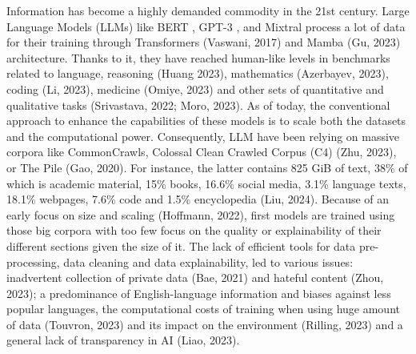 \documentclass{article}
\begin{document}
Information has become a highly demanded commodity in the 21st century. Large Language Models (LLMs) like BERT \citep{devlin_bert_2019}, GPT-3 \citep{brown_language_2020}, and Mixtral \citep{jiang_mixtral_2024} process a lot of data for their training through Transformers (Vaswani, 2017) and Mamba (Gu, 2023) architecture. Thanks to it, they have reached human-like levels in benchmarks related to language, reasoning (Huang 2023), mathematics (Azerbayev, 2023), coding (Li, 2023), medicine (Omiye, 2023) and other sets of quantitative and qualitative tasks (Srivastava, 2022; Moro, 2023). As of today, the conventional approach to enhance the capabilities of these models is to scale both the datasets and the computational power. Consequently, LLM have been relying on massive corpora like CommonCrawls, Colossal Clean Crawled Corpus (C4) (Zhu, 2023), or The Pile (Gao, 2020). For instance, the latter contains 825 GiB of text, 38\% of which is academic material, 15\% books, 16.6\% social media, 3.1\% language texts, 18.1\% webpages, 7.6\% code and 1.5\% encyclopedia (Liu, 2024). Because of an early focus on size and scaling (Hoffmann, 2022), first models are trained using those big corpora with too few focus on the quality or explainability of their different sections given the size of it.  The lack of efficient tools for data pre-processing, data cleaning and data explainability,  led to various issues: inadvertent collection of private data (Bae, 2021) and hateful content (Zhou, 2023); a predominance of English-language information and biases against less popular languages, the computational costs of training when using huge amount of data (Touvron, 2023) and its impact on the environment (Rilling, 2023) and a general lack of transparency in AI (Liao, 2023).
\end{document}
